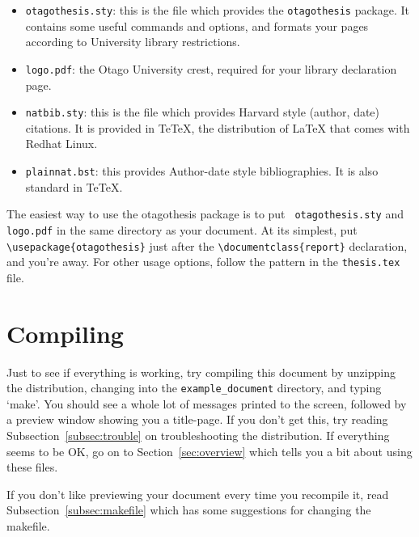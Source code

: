 \begin{itemize}
\item {\tt otagothesis.sty}: this is the file which provides the
{\tt otagothesis} package.  It contains some useful commands and
options, and formats your pages according to University library restrictions.
\item {\tt logo.pdf}: the Otago University crest, required for your
library declaration page.
\item {\tt natbib.sty}: this is the file which provides Harvard style
(author, date) citations.  It is provided in TeTeX, the distribution
of LaTeX that comes with Redhat Linux.
\item {\tt plainnat.bst}: this provides Author-date style bibliographies.
It is also standard in TeTeX.
\end{itemize}

The easiest way to use the otagothesis package is to put {\tt
otagothesis.sty} and {\tt logo.pdf} in the same directory as your
document.  At its simplest, put \verb|\usepackage{otagothesis}|
just after the \verb|\documentclass{report}| declaration, and you're
away.  For other usage options, follow the pattern in the
\verb|thesis.tex| file.

\section{Compiling}
Just to see if everything is working, try compiling this document by
unzipping the distribution, changing into the \verb|example_document|
directory, and
typing `make'.  You should see a whole lot of messages printed to the
screen, followed by a preview window showing you a title-page.  If you
don't get this, try reading Subsection~\ref{subsec:trouble} on
troubleshooting the distribution.  If everything seems to be OK, go on
to Section~\ref{sec:overview} which tells you a bit about using these files.

If you don't like previewing your document every time you recompile
it, read Subsection~\ref{subsec:makefile} which has some suggestions
for changing the makefile.

